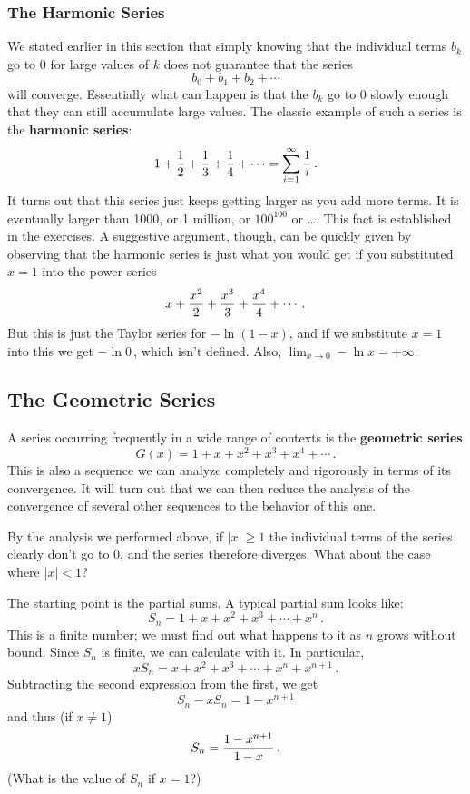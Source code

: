 {{{{\subsubsection{The Harmonic Series}

We stated earlier in this section that simply knowing that the individual terms $b_k$ go to 0 for large values of $k$ does not guarantee that the series
\[
b_0 + b_1 + b_2 + \cdots
\]
will converge.  
Essentially what can happen is that the $b_k$ go to 0 slowly enough that they can still accumulate large values.  The classic example of such a series is the {\bf harmonic series}:
\[
1 + {1\over 2} + {1 \over 3} + {1 \over 4} + \cdots = \sum_{i=1}^\infty {1\over i} \, .
\]
It turns out that this series just keeps getting larger as you add more terms. It is eventually larger than 1000, or 1 million, or $100^{100}$ or \ldots.  This fact is established in the exercises.  A suggestive argument, though, can be quickly given by observing that the harmonic series is just what you would get if you substituted $x=1$ into the power series
\[
{\displaystyle x+{x^2 \over 2} + {x^3 \over 3} + {x^4 \over 4}+\cdots \, .}
\]
But this is just the Taylor series for $-\ln(1-x)$, and if we substitute $x=1$ into this we get $-\ln{0}\, $, which isn't defined.  Also, $\lim_{x \to 0} -\ln{x}=+\infty$.

\subsection{The Geometric Series}

A series occurring frequently in a wide range of contexts is the {\bf geometric series}
\[
G(x) = 1 + x + x^2 +x^3 + x^4 +\cdots \,.
\]
This is also a sequence we can analyze completely and rigorously in terms of its convergence.  It will turn out that we can then reduce the analysis of the convergence of several other sequences to the behavior of this one.

By the analysis we performed above, 
if $|x|\ge 1$ the individual terms of the series clearly don't go to 0, and the series therefore diverges.  What about the case where $|x|<1$?

The starting point is the partial sums.  A typical partial sum looks like:
        \[
S_n =  1 +  x +  x^2 +  x^3 + \cdots +  x^n\, .
\]
This is a finite number; we must find out what happens to it as $n$ grows without bound.  Since $S_n$ is finite, we can calculate with it.  In particular,
        \[
xS_n =   x +  x^2 +  x^3 + \cdots +  x^n +  x^{n+1}\, .
\]
Subtracting the second expression from the first, we get
        \[
S_n - xS_n = 1  -  x^{n+1}
\]
and thus (if $x \neq 1$)
        \[
S_n =   {1 - x^{n+1} \over 1-x}\, .
\]
(What is the value of $S_n$ if $x=1$?)

}}}}
